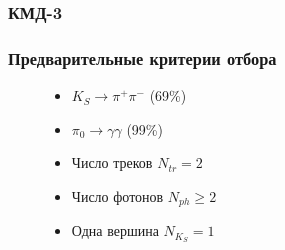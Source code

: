 \documentclass[14pt, hyperref = {colorlinks}]{beamer}
\begin{document}
\begin{frame}
\frametitle{КМД-3}
\begin{figure}[h]
\hfill
\end{figure}
\end{frame}

\begin{frame}\label{r}
\frametitle{Предварительные критерии отбора}
\begin{figure}[h]
\begin{minipage}[h]{0.59\linewidth}

\begin{itemize}
    \item $K_{S} \to \pi^{+} \pi^{-}$ (69\%)
    \item $\pi_{0} \to \gamma \gamma$ (99\%)
\end{itemize}
\begin{itemize}
  \item {Число треков $N_{tr} = 2$} 
  \item {Число фотонов $N_{ph} \geq 2$}
  \item {Одна вершина $N_{K_{S}} = 1$}
\end{itemize}
\end{minipage}
\begin{minipage}[h]{0.39\linewidth}
\end{minipage}
\end{figure}
\end{frame} 
\end{document}
